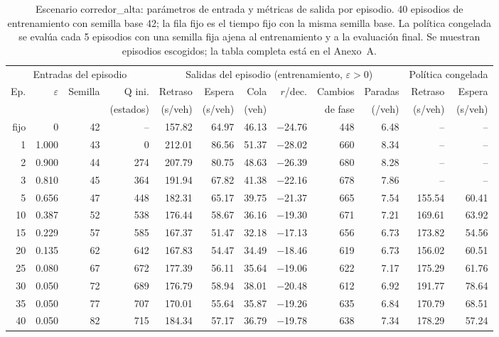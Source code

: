 \begin{table}[H]
\centering
\scriptsize
\setlength{\tabcolsep}{3pt}
\begin{tabular}{rrrrrrrrrrrr}
\toprule
\multicolumn{4}{c}{Entradas del episodio} & \multicolumn{6}{c}{Salidas del episodio (entrenamiento, $\varepsilon>0$)} & \multicolumn{2}{c}{Política congelada} \\
\cmidrule(lr){1-4}\cmidrule(lr){5-10}\cmidrule(lr){11-12}
Ep. & $\varepsilon$ & Semilla & Q ini. & Retraso & Espera & Cola & $r$/dec. & Cambios & Paradas & Retraso & Espera \\
 &  &  & (estados) & (s/veh) & (s/veh) & (veh) &  & de fase & (/veh) & (s/veh) & (s/veh) \\
\midrule
fijo & 0 & 42 & -- & 157.82 & 64.97 & 46.13 & $-$24.76 & 448 & 6.48 & -- & -- \\
\midrule
1 & 1.000 & 43 & 0 & 212.01 & 86.56 & 51.37 & $-$28.02 & 660 & 8.34 & -- & -- \\
2 & 0.900 & 44 & 274 & 207.79 & 80.75 & 48.63 & $-$26.39 & 680 & 8.28 & -- & -- \\
3 & 0.810 & 45 & 364 & 191.94 & 67.82 & 41.38 & $-$22.16 & 678 & 7.86 & -- & -- \\
5 & 0.656 & 47 & 448 & 182.31 & 65.17 & 39.75 & $-$21.37 & 665 & 7.54 & 155.54 & 60.41 \\
10 & 0.387 & 52 & 538 & 176.44 & 58.67 & 36.16 & $-$19.30 & 671 & 7.21 & 169.61 & 63.92 \\
15 & 0.229 & 57 & 585 & 167.37 & 51.47 & 32.18 & $-$17.13 & 656 & 6.73 & 173.82 & 54.56 \\
20 & 0.135 & 62 & 642 & 167.83 & 54.47 & 34.49 & $-$18.46 & 619 & 6.73 & 156.02 & 60.51 \\
25 & 0.080 & 67 & 672 & 177.39 & 56.11 & 35.64 & $-$19.06 & 622 & 7.17 & 175.29 & 61.76 \\
30 & 0.050 & 72 & 689 & 176.79 & 58.94 & 38.01 & $-$20.48 & 612 & 6.92 & 191.77 & 78.64 \\
35 & 0.050 & 77 & 707 & 170.01 & 55.64 & 35.87 & $-$19.26 & 635 & 6.84 & 170.79 & 68.51 \\
40 & 0.050 & 82 & 715 & 184.34 & 57.17 & 36.79 & $-$19.78 & 638 & 7.34 & 178.29 & 57.24 \\
\bottomrule
\end{tabular}
\caption[Escenario corredor\_alta: episodios de entrenamiento]{Escenario corredor\_alta: parámetros de entrada y métricas de salida por episodio. 40 episodios de entrenamiento con semilla base 42; la fila fijo es el tiempo fijo con la misma semilla base. La política congelada se evalúa cada 5 episodios con una semilla fija ajena al entrenamiento y a la evaluación final. Se muestran episodios escogidos; la tabla completa está en el Anexo~A.}
\label{tab:corredor_alta-episodios-resumen}
\end{table}

